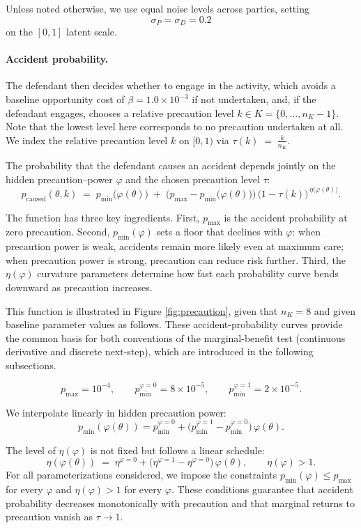 \documentclass{article}
\begin{document}
Unless noted otherwise, we use equal noise levels across parties, setting
\[
\sigma_P = \sigma_D = 0.2
\]
on the $[0,1]$ latent scale.


\paragraph{Accident probability.}

The defendant then decides whether to engage in the activity, which avoids a baseline opportunity cost of $\beta = 1.0 \times 10^{-3}$ if not undertaken, and, if the defendant engages, chooses a relative precaution level $k \in K = \{0,\dots,n_K-1\}$. Note that the lowest level here corresponds to no precaution undertaken at all. We index the relative precaution level $k$ on $[0,1)$ via $\tau(k) \;=\; \frac{k}{n_K }$.

The probability that the defendant causes an accident depends jointly on the hidden precaution–power $\varphi$ and the chosen precaution level $\tau$:
\[
p_{\mathrm{caused}}(\theta,k)
\;=\;
p_{\min}\!\bigl(\varphi(\theta)\bigr)
\;+\;
\bigl(p_{\max}-p_{\min}\!\bigl(\varphi(\theta)\bigr)\bigr)\,
\bigl(1-\tau(k)\bigr)^{\,\eta\!\bigl(\varphi(\theta)\bigr)}.
\]

The function has three key ingredients. First, $p_{\max}$ is the accident probability at zero precaution. Second, $p_{\min}(\varphi)$ sets a floor that declines with $\varphi$: when precaution power is weak, accidents remain more likely even at maximum care; when precaution power is strong, precaution can reduce risk further. Third, the  $\eta(\varphi)$ curvature parameters determine how fast each probability curve bends downward as precaution increases.

This function is illustrated in Figure \ref{fig:precaution}, given that $n_K = 8$ and given baseline parameter values as follows. These accident-probability curves provide the common basis for both conventions of the marginal-benefit test (continuous derivative and discrete next-step), which are introduced in the following subsections.

\[
p_{\max}=10^{-4}, \qquad 
p_{\min}^{\varphi=0}=8\times 10^{-5}, \qquad 
p_{\min}^{\varphi=1}=2\times 10^{-5}.
\]

We interpolate linearly in hidden precaution power:
\[
p_{\min}(\varphi(\theta)) = p_{\min}^{\varphi=0} +
\bigl(p_{\min}^{\varphi=1}-p_{\min}^{\varphi=0}\bigr)\,\varphi(\theta).
\]

The level of $\eta(\varphi)$ is not fixed but follows a linear schedule:
\[
\eta(\varphi(\theta)) \;=\; \eta^{\varphi=0} + 
\bigl(\eta^{\varphi=1}-\eta^{\varphi=0}\bigr)\,\varphi(\theta),
\qquad \eta(\varphi) > 1.
\]
For all parameterizations considered, we impose the constraints $p_{\min}(\varphi) \leq p_{\max}$ for every $\varphi$ and $\eta(\varphi) > 1$ for every $\varphi$. These conditions guarantee that accident probability decreases monotonically with precaution and that marginal returns to precaution vanish as $\tau \to 1$.
\end{document}
